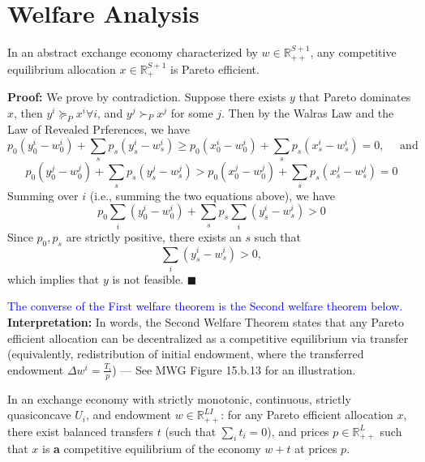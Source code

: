 \section{Welfare Analysis}
\begin{proposition}
    In an abstract exchange economy characterized by $w \in \mathbb{R}^{S+1}_{++}$, 
    any competitive equilibrium allocation $x \in \mathbb{R}^{S+1}_{+}$
    is Pareto efficient.
\end{proposition}

\noindent \textbf{Proof:} We prove by contradiction. 
Suppose there exists $y$ that Pareto dominates $x$, then 
$y^i \succeq_P x^i \forall i$,
and  
$y^j \succ_P x^j$ for some $j$.
Then by the Walras Law and the Law of Revealed Prferences, we have 
\[
p_0 (y^i_0 - w^i_0) + \sum_s p_s (y^i_s - w^i_s) \geq p_0 (x^i_0 - w^i_0) + \sum_s p_s (x^i_s - w^i_s) = 0, \quad \text{ and }
\]
\[
p_0 (y^j_0 - w^j_0) + \sum_s p_s (y^j_s - w^j_s) > p_0 (x^j_0 - w^j_0) + \sum_s p_s (x^j_s - w^j_s) = 0
\]
Summing over $i$ (i.e., summing the two equations above), we have 
\[
p_0 \sum_i (y^i_0 - w^i_0) + \sum_s p_s \sum_i (y^i_s - w^i_s) > 0
\]
Since $p_0, p_s$ are strictly positive, 
there exists an $s$ such that
\[
\sum_i (y^i_s - w^i_s) > 0,
\]
which implies that $y$ is not feasible. \(\blacksquare\)

\textcolor{blue}{The converse of the First welfare theorem is the Second welfare theorem below.}
\noindent \textbf{Interpretation:}
In words, the Second Welfare Theorem states that 
any Pareto efficient allocation can be decentralized as a competitive equilibrium via 
transfer (equivalently, redistribution of initial endowment, where the transferred endowment 
$\Delta w^i = \frac{T_i}{p}$) --- See MWG Figure 15.b.13 for an illustration.

\begin{proposition}
    In an exchange economy with strictly monotonic, continuous, strictly quasiconcave $U_i$,
    and endowment $w \in \mathbb{R}_{++}^{LI}$:
    for any Pareto efficient allocation $x$, there exist balanced transfers $t$ (such that $\sum_i t_i = 0$), 
    and prices $p \in \mathbb{R}^L_{++}$ such that $x$ is \textbf{a} competitive equilibrium of the economy 
    $w + t$ at prices $p$.
\end{proposition}


